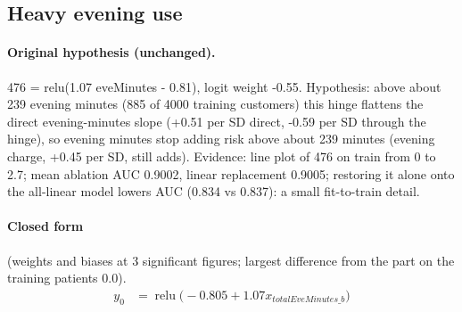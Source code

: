 \documentclass[a4paper,10pt]{article}
\newif\ifreviewmarks
\newcommand{\reviewrule}{\noindent{\color{BrickRed}\rule{\linewidth}{0.8pt}}}
\newenvironment{drafted}[1][]{%
  \ifreviewmarks\par\addvspace{\medskipamount}\reviewrule\par\nopagebreak
  \noindent{\color{BrickRed}\sffamily\footnotesize\textbf{Thesis Draft}\quad #1\hfill review}\par\nopagebreak\smallskip\fi}{%
  \ifreviewmarks\par\smallskip\noindent{\color{BrickRed}\sffamily\footnotesize end of thesis draft}\par\nopagebreak\reviewrule\par\medskip\fi}
\begin{document}
\begin{drafted}[plain-language layer: churn100-s2-c1]
\subsection{Heavy evening use}\label{tech:ann94}
\paragraph{Original hypothesis (unchanged).} 476 = relu(1.07 eveMinutes - 0.81), logit weight -0.55. Hypothesis: above about 239 evening minutes (885 of 4000 training customers) this hinge flattens the direct evening-minutes slope (+0.51 per SD direct, -0.59 per SD through the hinge), so evening minutes stop adding risk above about 239 minutes (evening charge, +0.45 per SD, still adds). Evidence: line plot of 476 on train from 0 to 2.7; mean ablation AUC 0.9002, linear replacement 0.9005; restoring it alone onto the all-linear model lowers AUC (0.834 vs 0.837): a small fit-to-train detail.
\paragraph{Closed form} {\footnotesize(weights and biases at 3 significant figures; largest difference from the part on the training patients 0.0).}
{\small\begingroup\allowdisplaybreaks
\begin{align*}
y_{0} &= \operatorname{relu}\bigl(-0.805 + 1.07 x_{totalEveMinutes\_b}\bigr)
\end{align*}\endgroup}


\end{drafted}
\end{document}
